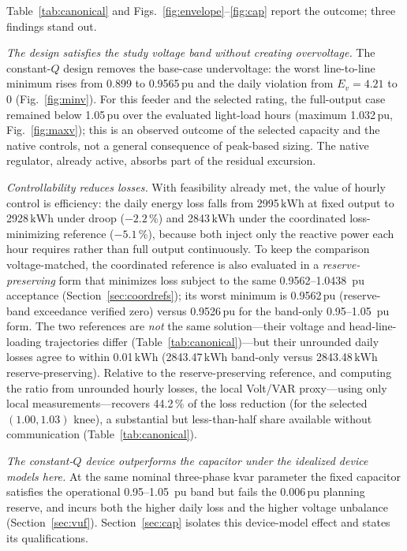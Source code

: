 \documentclass{ieeeaccess}
\newcommand{\num}[1]{#1}
\newcommand{\SI}[2]{#1\,\ensuremath{\mathrm{#2}}}
\newcommand{\numrange}[2]{#1\mbox{--}#2}
\begin{document}
Table~\ref{tab:canonical} and Figs.~\ref{fig:envelope}--\ref{fig:cap} report the
outcome; three findings stand out.

\emph{The design satisfies the study voltage band without creating overvoltage.} The constant-$Q$
design removes the base-case undervoltage: the worst line-to-line minimum rises
from \num{0.899} to \SI{0.9565}{pu} and the daily violation from $E_v=\num{4.21}$
to \num{0} (Fig.~\ref{fig:minv}). For this feeder and the selected rating, the
full-output case remained below \SI{1.05}{pu} over the evaluated light-load hours
(maximum \SI{1.032}{pu}, Fig.~\ref{fig:maxv}); this is an observed outcome of the
selected capacity and the native controls, not a general consequence of peak-based
sizing. The native regulator, already active, absorbs part of the residual excursion.

\emph{Controllability reduces losses.} With feasibility already met, the value of
hourly control is efficiency: the daily energy loss falls from \SI{2995}{kWh} at
fixed output to \SI{2928}{kWh} under droop ($-\SI{2.2}{\%}$) and \SI{2843}{kWh}
under the coordinated loss-minimizing reference ($-\SI{5.1}{\%}$), because both
inject only the reactive power each hour requires rather than full output
continuously. To keep the comparison voltage-matched, the coordinated reference is
also evaluated in a \emph{reserve-preserving} form that minimizes loss subject to the
same \numrange{0.9562}{1.0438}~pu acceptance (Section~\ref{sec:coordrefs}); its worst
minimum is \SI{0.9562}{pu} (reserve-band exceedance verified zero) versus
\SI{0.9526}{pu} for the band-only \numrange{0.95}{1.05}~pu form. The two references
are \emph{not} the same solution---their voltage and head-line-loading trajectories
differ (Table~\ref{tab:canonical})---but their unrounded daily losses agree to within
\SI{0.01}{kWh} (\SI{2843.47}{kWh} band-only versus \SI{2843.48}{kWh}
reserve-preserving). Relative to the reserve-preserving reference, and computing the
ratio from unrounded hourly losses, the local Volt/VAR proxy---using only local
measurements---recovers \SI{44.2}{\%} of the loss reduction (for the selected
$(1.00,1.03)$ knee), a substantial but less-than-half share available without
communication (Table~\ref{tab:canonical}).

\emph{The constant-$Q$ device outperforms the capacitor under the idealized device
models here.} At the same nominal three-phase kvar parameter the fixed capacitor
satisfies the operational \numrange{0.95}{1.05}~pu band but fails the
\SI{0.006}{pu} planning reserve, and incurs both the higher daily loss and the
higher voltage unbalance (Section~\ref{sec:vuf}). Section~\ref{sec:cap} isolates
this device-model effect and states its qualifications.
\end{document}
